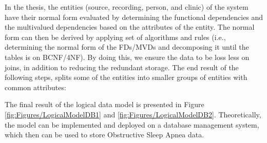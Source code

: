 In the thesis, the entities (source, recording, person, and clinic) of the system have their normal form evaluated by determining the functional dependencies and the multivalued dependencies based on the attributes of the entity. The normal form can then be derived by applying set of algorithms and rules (i.e., determining the normal form of the FDs/MVDs and decomposing it until the tables is on BCNF/4NF). By doing this, we ensure the data to be loss less on joins, in addition to reducing the redundant storage. The end result of the following steps, splits some of the entities into smaller groups of entities with common attributes:

%    
%    

The final result of the logical data model is presented in Figure \ref{fig:Figures/LogicalModelDB1} and \ref{fig:Figures/LogicalModelDB2}. Theoretically, the model can be implemented and deployed on a database management system, which then can be used to store Obstructive Sleep Apnea data.

